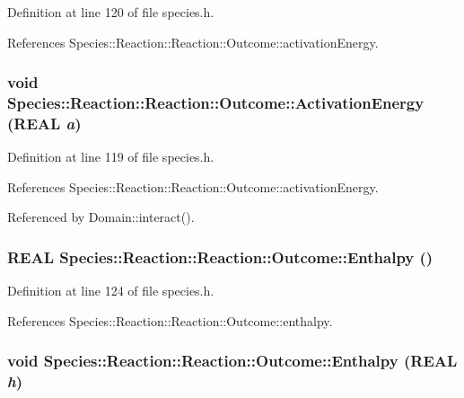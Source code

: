Definition at line 120 of file species.h.

References Species::Reaction::Reaction::Outcome::activationEnergy.\hypertarget{structSpecies_1_1Reaction_1_1Outcome_5af56168a504050654b3be2573176ea8}{
\subsubsection[{ActivationEnergy}]{\setlength{\rightskip}{0pt plus 5cm}void Species::Reaction::Reaction::Outcome::ActivationEnergy (REAL {\em a})}}
\label{structSpecies_1_1Reaction_1_1Outcome_5af56168a504050654b3be2573176ea8}




Definition at line 119 of file species.h.

References Species::Reaction::Reaction::Outcome::activationEnergy.

Referenced by Domain::interact().\hypertarget{structSpecies_1_1Reaction_1_1Outcome_499c792cd3b6b76ff268184c46c3a4d6}{
\subsubsection[{Enthalpy}]{\setlength{\rightskip}{0pt plus 5cm}REAL Species::Reaction::Reaction::Outcome::Enthalpy ()}}
\label{structSpecies_1_1Reaction_1_1Outcome_499c792cd3b6b76ff268184c46c3a4d6}




Definition at line 124 of file species.h.

References Species::Reaction::Reaction::Outcome::enthalpy.\hypertarget{structSpecies_1_1Reaction_1_1Outcome_55e9f04c416460fadb84788ba9e5108c}{
\subsubsection[{Enthalpy}]{\setlength{\rightskip}{0pt plus 5cm}void Species::Reaction::Reaction::Outcome::Enthalpy (REAL {\em h})}}
\label{structSpecies_1_1Reaction_1_1Outcome_55e9f04c416460fadb84788ba9e5108c}





